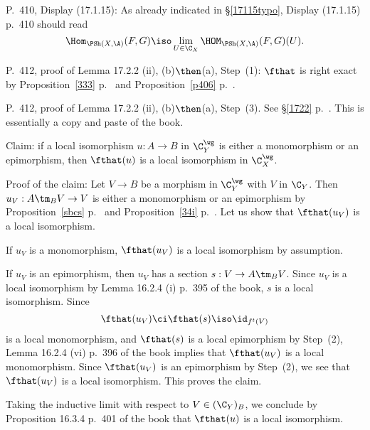 \documentclass[12pt]{article}
\theoremstyle{remark}
\theoremstyle{definition}
\begin{document}
%

\begin{s}
P.~410, Display (17.1.15): As already indicated in \S\ref{17115typo}, Display (17.1.15) p.~410 should read 
$$
\Hom_{\PSh(X,\A)}(F,G)\iso\lim_{U\in\C_X}\HOM_{\PSh(X,\A)}(F,G)(U).
$$ 
\end{s}

%

\begin{s}
P.~412, proof of Lemma 17.2.2 (ii), (b)$\then$(a), Step~(1): $\fthat$ is right exact by Proposition~\ref{333} p.~ and Proposition~\ref{p406} p.~.
\end{s}

%

\begin{s}
P.~412, proof of Lemma 17.2.2 (ii), (b)$\then$(a), Step~(3). See \S\ref{1722} p.~. This is essentially a copy and paste of the book.

Claim: if a local isomorphism $u:A\to B$ in $\C_Y^\wg$ is either a monomorphism or an epimorphism, then $\fthat(u)$ is a local isomorphism in $\C_X^\wg$. 

Proof of the claim: Let $V\to B$ be a morphism in $\C_Y^\wg$ with $V$ in $\C_Y$. Then $u_V: A\tm_BV\to V$ is either a monomorphism or an epimorphism by Proposition~\ref{sbcs} p.~ and Proposition~\ref{34i} p.~. Let us show that $\fthat(u_V)$ is a local isomorphism. 

If $u_V$ is a monomorphism, $\fthat(u_V)$ is a local isomorphism by assumption. 

If $u_V$ is an epimorphism, then $u_V$ has a section $s:V\to A\tm_BV$. Since $u_V$ is a local isomorphism by Lemma 16.2.4 (i) p.~395 of the book, $s$ is a local isomorphism. Since 
$$
\fthat(u_V)\ci\fthat(s)\iso\id_{f^t(V)}
$$ 
is a local monomorphism, and $\fthat(s)$ is a local epimorphism by Step~(2), Lemma 16.2.4 (vi) p.~396 of the book implies that $\fthat(u_V)$ is a local monomorphism. Since $\fthat(u_V)$ is an epimorphism by Step~(2), we see that $\fthat(u_V)$ is a local isomorphism. This proves the claim.

Taking the inductive limit with respect to $V\in(\C_Y)_B$, we conclude by Proposition 16.3.4 p.~401 of the book that $\fthat(u)$ is a local isomorphism.
\end{s}

%
\end{document}
